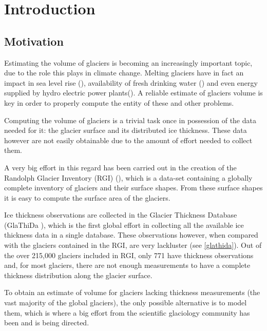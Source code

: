 \chapter{Introduction}\label{chap1}
\thispagestyle{plain}

\section{Motivation}\label{motivation}
Estimating the volume of glaciers is becoming an increasingly important topic, due to the role this plays in climate change. Melting glaciers have in fact an impact in sea level rise (\citet{Zemp2017}), availability of fresh drinking water (\citet{Kaser2010}) and even energy supplied by hydro electric power plants(\citet{Terrier2011}). A reliable estimate of glaciers volume is key in order to properly compute the entity of these and other problems.

Computing the volume of glaciers is a trivial task once in possession of the data needed for it: the glacier surface and its distributed ice thickness. These data however are not easily obtainable due to the amount of effort needed to collect them.

A very big effort in this regard has been carried out in the creation of the Randolph Glacier Inventory (RGI) (\citet{RGI2014}), which is a data-set containing a globally complete inventory of glaciers and their surface shapes. From these surface shapes it is easy to compute the surface area of the glaciers.

Ice thickness observations are collected in the Glacier Thickness Database (GlaThiDa \citet{GlaThiDa2014}), which is the first global effort in collecting all the available ice thickness data in a single database. These observations however, when compared with the glaciers contained in the RGI, are very lackluster (see \ref{glathida}). Out of the over 215,000 glaciers included in RGI, only 771 have thickness observations and, for most glaciers, there are not enough measurements to have a complete thickness distribution along the glacier surface. 

To obtain an estimate of volume for glaciers lacking thickness measurements (the vast majority of the global glaciers), the only possible alternative is to model them, which is where a big effort from the scientific glaciology community has been and is being directed.
  


